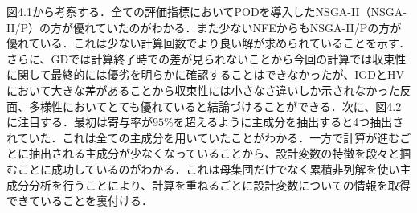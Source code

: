 \documentclass[11pt,a4j,notitlepage]{jsarticle}
\begin{document}
図4.1から考察する．全ての評価指標においてPODを導入したNSGA-II（NSGA-II/P）の方が優れていたのがわかる．また少ないNFEからもNSGA-II/Pの方が優れている．これは少ない計算回数でより良い解が求められていることを示す．さらに、GDでは計算終了時での差が見られないことから今回の計算では収束性に関して最終的には優劣を明らかに確認することはできなかったが、IGDとHVにおいて大きな差があることから収束性には小さなさ違いしか示されなかった反面、多様性においてとても優れていると結論づけることができる．次に、図4.2に注目する．最初は寄与率が$95\%$を超えるように主成分を抽出すると4つ抽出されていた．これは全ての主成分を用いていたことがわかる．一方で計算が進むごとに抽出される主成分が少なくなっていることから、設計変数の特徴を段々と掴むことに成功しているのがわかる．これは母集団だけでなく累積非列解を使い主成分分析を行うことにより、計算を重ねるごとに設計変数についての情報を取得できていることを裏付ける．

\end{document}
